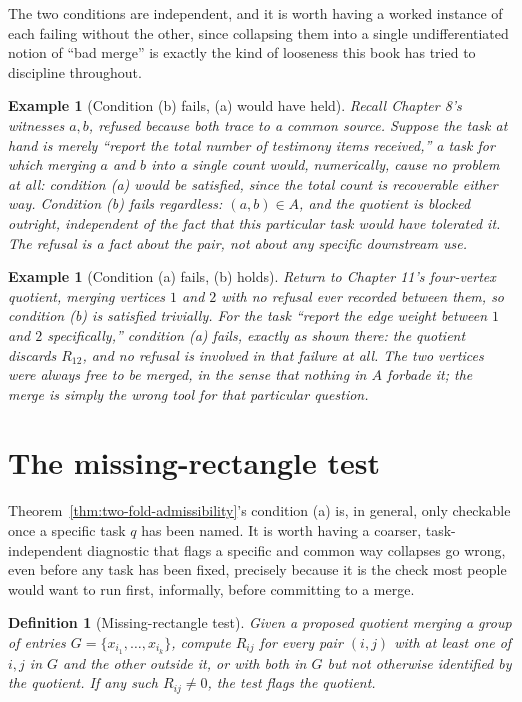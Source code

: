 \documentclass[11pt]{book}
\newtheorem{definition}[theorem]{Definition}
\newtheorem{example}[theorem]{Example}
\begin{document}
The two conditions are independent, and it is worth having a worked instance of each failing without the other, since collapsing them into a single undifferentiated notion of ``bad merge'' is exactly the kind of looseness this book has tried to discipline throughout.

\begin{example}[Condition (b) fails, (a) would have held]
Recall Chapter 8's witnesses $a,b$, refused because both trace to a common source. Suppose the task at hand is merely ``report the total number of testimony items received,'' a task for which merging $a$ and $b$ into a single count would, numerically, cause no problem at all: condition (a) would be satisfied, since the total count is recoverable either way. Condition (b) fails regardless: $(a,b)\in A$, and the quotient is blocked outright, independent of the fact that this particular task would have tolerated it. The refusal is a fact about the pair, not about any specific downstream use.
\end{example}

\begin{example}[Condition (a) fails, (b) holds]
Return to Chapter 11's four-vertex quotient, merging vertices $1$ and $2$ with no refusal ever recorded between them, so condition (b) is satisfied trivially. For the task ``report the edge weight between $1$ and $2$ specifically,'' condition (a) fails, exactly as shown there: the quotient discards $R_{12}$, and no refusal is involved in that failure at all. The two vertices were always free to be merged, in the sense that nothing in $A$ forbade it; the merge is simply the wrong tool for that particular question.
\end{example}

\section{The missing-rectangle test}

Theorem~\ref{thm:two-fold-admissibility}'s condition (a) is, in general, only checkable once a specific task $q$ has been named. It is worth having a coarser, task-independent diagnostic that flags a specific and common way collapses go wrong, even before any task has been fixed, precisely because it is the check most people would want to run first, informally, before committing to a merge.

\begin{definition}[Missing-rectangle test]
Given a proposed quotient merging a group of entries $G=\{x_{i_1},\ldots,x_{i_k}\}$, compute $R_{ij}$ for every pair $(i,j)$ with at least one of $i,j$ in $G$ and the other outside it, or with both in $G$ but not otherwise identified by the quotient. If any such $R_{ij}\ne0$, the test flags the quotient.
\end{definition}
\end{document}
